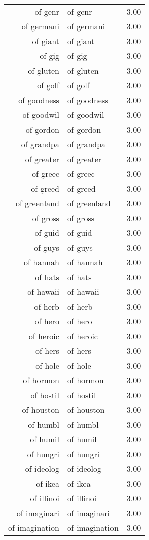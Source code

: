 \begin{table}[ht]
\begin{tabular}{rlr}
  of genr & of genr & 3.00 \\ 
  of germani & of germani & 3.00 \\ 
  of giant & of giant & 3.00 \\ 
  of gig & of gig & 3.00 \\ 
  of gluten & of gluten & 3.00 \\ 
  of golf & of golf & 3.00 \\ 
  of goodness & of goodness & 3.00 \\ 
  of goodwil & of goodwil & 3.00 \\ 
  of gordon & of gordon & 3.00 \\ 
  of grandpa & of grandpa & 3.00 \\ 
  of greater & of greater & 3.00 \\ 
  of greec & of greec & 3.00 \\ 
  of greed & of greed & 3.00 \\ 
  of greenland & of greenland & 3.00 \\ 
  of gross & of gross & 3.00 \\ 
  of guid & of guid & 3.00 \\ 
  of guys & of guys & 3.00 \\ 
  of hannah & of hannah & 3.00 \\ 
  of hats & of hats & 3.00 \\ 
  of hawaii & of hawaii & 3.00 \\ 
  of herb & of herb & 3.00 \\ 
  of hero & of hero & 3.00 \\ 
  of heroic & of heroic & 3.00 \\ 
  of hers & of hers & 3.00 \\ 
  of hole & of hole & 3.00 \\ 
  of hormon & of hormon & 3.00 \\ 
  of hostil & of hostil & 3.00 \\ 
  of houston & of houston & 3.00 \\ 
  of humbl & of humbl & 3.00 \\ 
  of humil & of humil & 3.00 \\ 
  of hungri & of hungri & 3.00 \\ 
  of ideolog & of ideolog & 3.00 \\ 
  of ikea & of ikea & 3.00 \\ 
  of illinoi & of illinoi & 3.00 \\ 
  of imaginari & of imaginari & 3.00 \\ 
  of imagination & of imagination & 3.00 \\ 

\end{tabular}
\end{table}
